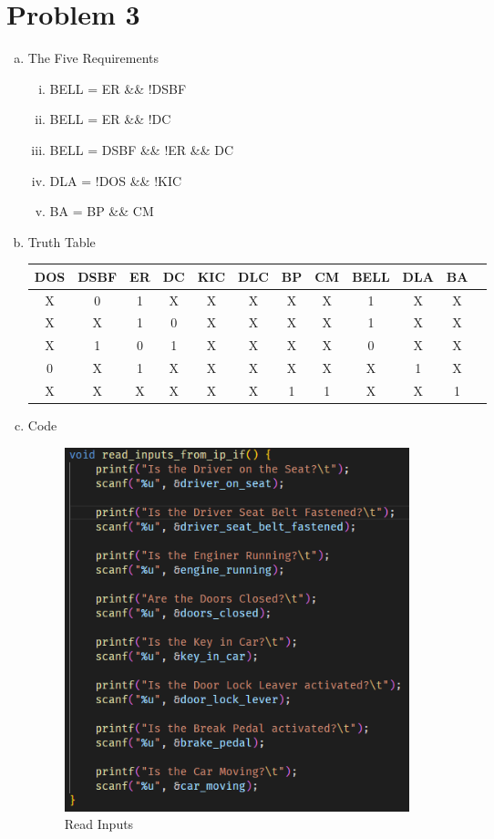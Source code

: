 \clearpage
\section*{Problem 3}
\begin{enumerate}[a)]
    \item The Five Requirements
    \begin{enumerate}[i.]
        \item BELL = ER \&\& !DSBF
        \item BELL = ER \&\& !DC
        \item BELL = DSBF \&\& !ER \&\& DC
        \item DLA = !DOS \&\& !KIC
        \item BA = BP \&\& CM
    \end{enumerate}
    \item Truth Table\\
    \begin{tabular}{|c|c|c|c|c|c|c|c|c|c|c|c}
        \hline
        DOS & DSBF & ER & DC & KIC & DLC & BP & CM & BELL & DLA & BA \\
        \hline
        X & 0 & 1 & X & X & X & X & X & 1 & X & X\\
        \hline
        X & X & 1 & 0 & X & X & X & X & 1 & X & X\\
        \hline
        X & 1 & 0 & 1 & X & X & X & X & 0 & X & X\\
        \hline
        0 & X & 1 & X & X & X & X & X & X & 1 & X\\
        \hline
        X & X & X & X & X & X & 1 & 1 & X & X & 1\\
        \hline
    \end{tabular}
    
    \item Code
    
    \begin{figure}[!ht]
        \centering
        \includegraphics[width=0.5\textwidth]{Images/3a Code Read.png}
        \caption{Read Inputs}
    \end{figure}
    

\end{enumerate}
